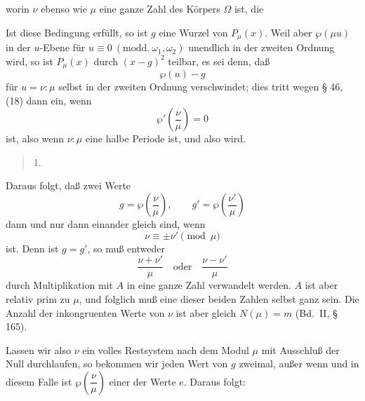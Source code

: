 
worin $\nu$ ebenso wie $\mu$ eine ganze Zahl des Körpers $\Omega$ ist, die 

Ist diese Bedingung erfüllt, so ist $g$ eine Wurzel von $P_\mu(x)$. Weil aber $\wp(\mu u)$ in der $u$-Ebene für $u\equiv 0\ (\mathrm{modd}.\ \omega_1,\omega_2)$ unendlich in der zweiten Ordnung wird, so ist $P_\mu(x)$ durch $(x-g)^2$ teilbar, es sei denn, daß
\[ \wp(u) - g \]
für $u=\nu:\mu$ selbst in der zweiten Ordnung verschwindet; dies tritt wegen § 46, (18) dann ein, wenn
\[ \wp'\left(\dfrac{\nu}{\mu}\right) = 0 \]
ist, also wenn $\nu:\mu$ eine halbe Periode ist, und also
wird.

\begin{quote}
{\small 1. }
\end{quote}

Daraus folgt, daß zwei Werte
\[ g = \wp\left(\dfrac{\nu}{\mu}\right), \qquad g' = \wp\left(\dfrac{\nu'}{\mu}\right) \]
dann und nur dann einander gleich sind, wenn
\[ \nu \equiv \pm \nu' \pmod{\mu} \]
ist. Denn ist $g=g'$, so muß entweder
\[ \dfrac{\nu+\nu'}{\mu} \quad \text{oder} \quad \dfrac{\nu-\nu'}{\mu} \]
durch Multiplikation mit $A$ in eine ganze Zahl verwandelt werden. $A$ ist aber relativ prim zu $\mu$, und folglich muß eine dieser beiden Zahlen selbst ganz sein. Die Anzahl der inkongruenten Werte von $\nu$ ist aber gleich $N(\mu) = m$ (Bd.\ II, § 165).

Lassen wir also $\nu$ ein volles Restsystem nach dem Modul $\mu$ mit Ausschluß der Null durchlaufen, so bekommen wir jeden Wert von $g$ zweimal, außer wenn
und in diesem Falle ist $\wp\left(\dfrac{\nu}{\mu}\right)$ einer der Werte $e$. Daraus folgt:
